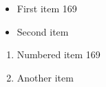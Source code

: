 \documentclass{article}
\begin{document}
\begin{itemize}
\item First item 169
\item Second item
\end{itemize}
\begin{enumerate}
\item Numbered item 169
\item Another item
\end{enumerate}
\end{document}
